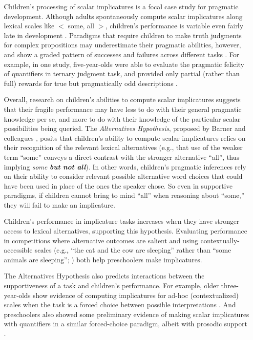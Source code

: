 \documentclass[10pt,letterpaper]{article}
\begin{document}
Children's processing of scalar implicatures is a focal case study for pragmatic development. Although adults spontaneously compute scalar implicatures along lexical scales like $<$ {\sc some, all} $>$, children's performance is variable even fairly late in development \citep{noveck2001}.  Paradigms that require children to make truth judgments for complex propositions may underestimate their pragmatic abilities, however, and show a graded pattern of successes and failures across different tasks \citep{guasti2005,papafragou2003, papafragou2004}. For example, in one study, five-year-olds were able to evaluate the pragmatic felicity of quantifiers in ternary judgment task, and provided only partial (rather than full) rewards for true but pragmatically odd descriptions \citep{katsos2011}.  

Overall, research on children's abilities to compute scalar implicatures suggests that their fragile performance may have less to do with their general pragmatic knowledge per se, and more to do with their knowledge of the particular scalar possibilities being queried. The \emph{Alternatives Hypothesis}, proposed by Barner and colleagues \citep{barner2010, barner2011}, posits that children's ability to compute scalar implicatures relies on their recognition of the relevant lexical alternatives (e.g., that use of the weaker term ``some'' conveys a direct contrast with the stronger alternative ``all'', thus implying \emph{some \textbf{but not all}}).  In other words, children's pragmatic inferences rely on their ability to consider relevant possible alternative word choices that could have been used in place of the ones the speaker chose. So even in supportive paradigms, if children cannot bring to mind ``all'' when reasoning about ``some,'' they will fail to make an implicature.

Children's performance in implicature tasks increases when they have stronger access to lexical alternatives, supporting this hypothesis.  Evaluating performance in competitions where alternative outcomes are salient \citep{papafragou2003} and using contextually-accessible scales (e.g., ``the cat and the cow are sleeping'' rather than ``some animals are sleeping''; \cite{barner2011}) both help preschoolers make implicatures. 

The Alternatives Hypothesis also predicts interactions between the supportiveness of a task and children's performance. For example, older three-year-olds show evidence of computing implicatures for ad-hoc (contextualized) scales when the task is a forced choice between possible interpretations \citep{stiller2014}. And preschoolers also showed some preliminary evidence of making scalar implicatures with quantifiers in a similar forced-choice paradigm, albeit with prosodic support \citep{miller2005}. 
\end{document}
